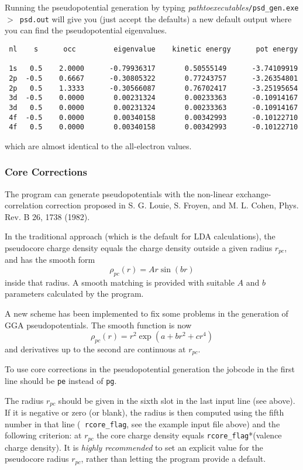 \documentclass[11pt]{article}
\begin{document}
Running the pseudopotential generation by typing
\textit{pathtoexecutables}\texttt{/psd{\_}gen.exe $>$ psd.out}
will give you (just accept the defaults) a new default output
where you can find the pseudopotential eigenvalues.

\begin{verbatim}
 nl    s      occ         eigenvalue    kinetic energy      pot energy

 1s   0.5    2.0000      -0.79936317       0.50555149      -3.74109919
 2p  -0.5    0.6667      -0.30805322       0.77243757      -3.26354801
 2p   0.5    1.3333      -0.30566087       0.76702417      -3.25195654
 3d  -0.5    0.0000       0.00231324       0.00233363      -0.10914167
 3d   0.5    0.0000       0.00231324       0.00233363      -0.10914167
 4f  -0.5    0.0000       0.00340158       0.00342993      -0.10122710
 4f   0.5    0.0000       0.00340158       0.00342993      -0.10122710
\end{verbatim}
which are almost identical to the all-electron values.


\subsubsection{Core Corrections}
\label{sec:cc}
The program can generate pseudopotentials with the non-linear
exchange-correlation correction proposed in S. G. Louie, S. Froyen,
and M. L. Cohen, Phys. Rev. B 26, 1738 (1982).

In the traditional approach (which is the default for LDA
calculations), the pseudocore charge density equals the charge density
outside a given radius $r_{pc}$, and has the smooth form
$$
\rho_{pc}(r) = A r   \sin(b r)
$$
inside that radius. A smooth matching is provided with suitable $A$ 
and $b$ parameters calculated by the program.

A new scheme has been implemented to fix some problems in the generation
of GGA pseudopotentials. The smooth function is now
$$
\rho_{pc}(r) =  r^2  \exp{(a + b r^2 +c r^4)}
$$
and derivatives up to the second are continuous  at $r_{pc}$.

To use core corrections in the pseudopotential generation
the jobcode in the first line should be {\tt pe} instead of {\tt pg}.

The radius $r_{pc}$ should be  given in the sixth slot in the last
input line (see above). If it is negative or zero (or blank), the
radius is then computed using the fifth number in that line ({\tt
rcore\_flag}, see the example input file above)
and the following criterion: at $r_{pc}$ the core charge density 
equals {\tt rcore\_flag}*(valence charge density).
It is {\it highly recommended} to set an explicit value for the pseudocore
radius $r_{pc}$, rather than letting the program provide a default.
\end{document}
